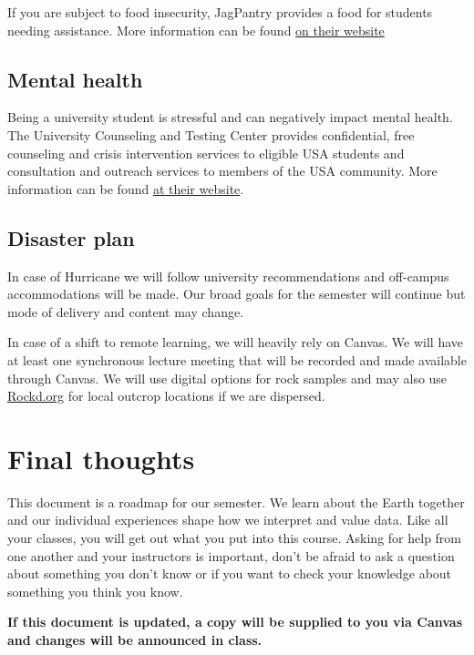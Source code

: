 \documentclass[11pt,]{article}
\begin{document}
If you are subject to food insecurity, JagPantry provides a food for
students needing assistance. More information can be found
\href{https://www.southalabama.edu/departments/sga/foodpantry.html}{on
their website}

\hypertarget{mental-health}{%
\subsection{Mental health}\label{mental-health}}

Being a university student is stressful and can negatively impact mental
health. The University Counseling and Testing Center provides
confidential, free counseling and crisis intervention services to
eligible USA students and consultation and outreach services to members
of the USA community. More information can be found
\href{https://www.southalabama.edu/departments/counseling/}{at their
website}.

\hypertarget{disaster-plan}{%
\subsection{Disaster plan}\label{disaster-plan}}

In case of Hurricane we will follow university recommendations and
off-campus accommodations will be made. Our broad goals for the semester
will continue but mode of delivery and content may change.

In case of a shift to remote learning, we will heavily rely on Canvas.
We will have at least one synchronous lecture meeting that will be
recorded and made available through Canvas. We will use digital options
for rock samples and may also use \href{https://rockd.org/}{Rockd.org}
for local outcrop locations if we are dispersed.

\hypertarget{final-thoughts}{%
\section{Final thoughts}\label{final-thoughts}}

This document is a roadmap for our semester. We learn about the Earth
together and our individual experiences shape how we interpret and value
data. Like all your classes, you will get out what you put into this
course. Asking for help from one another and your instructors is
important, don't be afraid to ask a question about something you don't
know or if you want to check your knowledge about something you think
you know.

\textbf{If this document is updated, a copy will be supplied to you via
Canvas and changes will be announced in class.}

\end{document}

